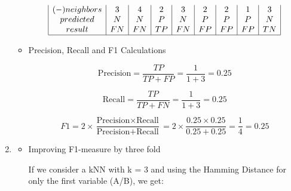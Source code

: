 \documentclass[12pt]{article}
\begin{document}
\begin{enumerate}[leftmargin=\labelsep, label=\textbf{\arabic*.)}]
\begin{itemize}
\begin{minipage}{1\textwidth}
\[\begin{array}{|c|c|c|c|c|c|c|c|c|}
                                (-) neighbors & 3   & 4   & 2   & 3   & 2   & 2   & 1   & 3   \\
                                predicted     & N   & N   & P   & N   & P   & P   & P   & N   \\
                                result        & FN  & FN  & TP  & FN  & FP  & FP  & FP  & TN  \\
                                \hline
                            \end{array}
                        \]
                    \end{minipage}
                \vspace{0.5em}
              \item Precision, Recall and F1 Calculations

                    \[
                        \text{Precision} = \frac{TP}{TP + FP} = \frac{1}{1 + 3} = 0.25
                    \]

                    \[
                        \text{Recall} = \frac{TP}{TP + FN} = \frac{1}{1 + 3} = 0.25
                    \]

                    \[
                        F1 = 2 \times \frac{\text{Precision} \times \text{Recall}}{\text{Precision} + \text{Recall}} = 2 \times \frac{0.25 \times 0.25}{0.25 + 0.25} = \frac{1}{4} = 0.25
                    \]

          \end{itemize}
          \vspace{0.5em}
    \item \begin{itemize}
              \item Improving F1-measure by three fold
                \vspace{0.5em}
                    
                    If we consider a kNN with k = 3 and using the Hamming Distance for only the first variable (A/B), we get:

                    \vspace{0.5em}


\end{itemize}
\end{enumerate}
\end{document}
